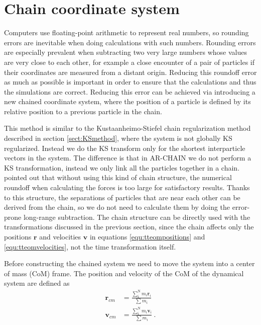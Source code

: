 \documentclass[english, oneside]{HYgradu}
\begin{document}
\section{Chain coordinate system} \label{sect:ChainSystem}

Computers use floating-point arithmetic to represent real numbers, so rounding errors are inevitable when doing calculations with such numbers. Rounding errors are especially prevalent when subtracting two very large numbers whose values are very close to each other, for example a close encounter of a pair of particles if their coordinates are measured from a distant origin. Reducing this roundoff error as much as possible is important in order to ensure that the calculations and thus the simulations are correct. Reducing this error can be achieved via introducing a new chained coordinate system, where the position of a particle is defined by its relative position to a previous particle in the chain.

This method is similar to the Kustaanheimo-Stiefel chain regularization method \citep{mikkola:1993} described in section \ref{sect:KSmethod}, where the system is not globally KS regularized. Instead we do the KS transform only for the shortest interparticle vectors in the system. The difference is that in AR-CHAIN we do not perform a KS transformation, instead we only link all the particles together in a chain. \cite{mikkola:1999} pointed out that without using this kind of chain structure, the numerical roundoff when calculating the forces is too large for satisfactory results. Thanks to this structure, the separations of particles that are near each other can be derived from the chain, so we do not need to calculate them by doing the error-prone long-range subtraction.
The chain structure can be directly used with the transformations discussed in the previous section, since the chain affects only the positions $\boldsymbol{r}$ and velocities $\boldsymbol{v}$ in equations \eqref{equ:tteompositions} and \eqref{equ:tteomvelocities}, not the time transformation itself.

Before constructing the chained system we need to move the system into a center of mass (CoM) frame. The position and velocity of the CoM of the dynamical system are defined as
\begin{equation}
\begin{aligned}
\boldsymbol{r}_{cm} &= \frac{\sum_\mathrm{i}^\mathrm{N} m_i \boldsymbol{r}_i}{\sum m_i} \\
\boldsymbol{v}_{cm} &= \frac{\sum_\mathrm{i}^\mathrm{N} m_i \boldsymbol{v}_i}{\sum m_i} \ .
\end{aligned}
\end{equation}
\end{document}
